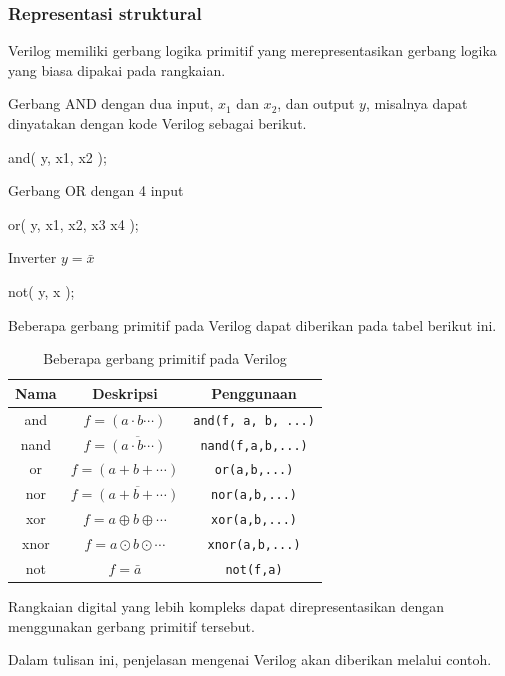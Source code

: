 \documentclass[a4paper,11pt,bahasa]{extarticle}
\begin{document}
\subsubsection{Representasi struktural}

Verilog memiliki gerbang logika primitif yang merepresentasikan
gerbang logika yang biasa dipakai pada rangkaian.

Gerbang AND dengan dua input, $x_1$ dan $x_2$,
dan output $y$, misalnya dapat dinyatakan dengan kode Verilog
sebagai berikut.
\begin{verilogcode}
and( y, x1, x2 );
\end{verilogcode}

Gerbang OR dengan 4 input
\begin{verilogcode}
or( y, x1, x2, x3 x4 );
\end{verilogcode}

Inverter $y = \bar{x}$
\begin{verilogcode}
not( y, x );
\end{verilogcode}

Beberapa gerbang primitif pada Verilog dapat diberikan
pada tabel berikut ini.
\begin{table}[h!]
\centering
\begin{tabular}{|ccc|}
\hline
Nama & Deskripsi & Penggunaan \\
\hline\hline
and & $f = (a \cdot b \cdots )$ & \verb|and(f, a, b, ...)| \\
nand & $f = \overline{(a \cdot b \cdots)}$ & \verb|nand(f,a,b,...)| \\
or & $f = (a + b + \cdots)$ & \verb|or(a,b,...)| \\
nor & $f = \overline{(a + b + \cdots)}$ & \verb|nor(a,b,...)| \\
xor & $f = a \oplus b \oplus \cdots $ & \verb|xor(a,b,...)| \\
xnor & $f = a \odot b \odot \cdots $ & \verb|xnor(a,b,...)| \\
not & $f = \bar{a}$ & \verb|not(f,a)| \\
\hline
\end{tabular}
\par
\caption{Beberapa gerbang primitif pada Verilog}
\end{table}

Rangkaian digital yang lebih kompleks
dapat direpresentasikan dengan menggunakan gerbang primitif tersebut.

Dalam tulisan ini, penjelasan mengenai Verilog akan diberikan
melalui contoh.
\end{document}
